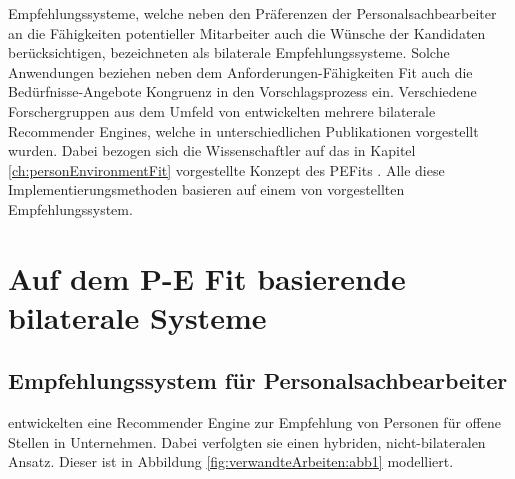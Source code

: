Empfehlungssysteme, welche neben den Präferenzen der Personalsachbearbeiter an die Fähigkeiten potentieller Mitarbeiter auch die Wünsche der Kandidaten berücksichtigen, bezeichneten \textcite[S. 4]{malinowski:2006} als bilaterale Empfehlungssysteme. Solche Anwendungen beziehen neben dem Anforderungen-Fähigkeiten Fit auch die Bedürfnisse-Angebote Kongruenz in den Vorschlagsprozess ein. Verschiedene Forschergruppen aus dem Umfeld von \textcite[S. 1ff.]{malinowski:2006} entwickelten mehrere bilaterale Recommender Engines, welche in unterschiedlichen Publikationen vorgestellt wurden. Dabei bezogen sich die Wissenschaftler auf das in Kapitel \ref{ch:personEnvironmentFit} vorgestellte Konzept des \acp{PEFit} \cite[S. 4f.]{keim:2007}\cite[S. 3f.]{keim:2005}\cite[S. 3f.]{malinowski:2005}\cite[S. 3f.]{malinowski:2006}\cite[S. 3ff.]{malinowski:2008}. Alle diese Implementierungsmethoden basieren auf einem von \textcite[S. 1ff.]{faerber:2003} vorgestellten Empfehlungssystem.

\section{Auf dem P-E Fit basierende bilaterale Systeme}
\label{ch:verwandteArbeiten:aufDemPEFitBasierendeBilateraleSysteme}

\subsection{Empfehlungssystem für Personalsachbearbeiter}
\label{ch:verwandteArbeiten:aufDemPEFitBasierendeBilateraleSysteme:grundlegendesEmpfelungssystem}
\textcite[S. 4ff.]{faerber:2003} entwickelten eine Recommender Engine zur Empfehlung von Personen für offene Stellen in Unternehmen. Dabei verfolgten sie einen hybriden, nicht-bilateralen Ansatz. Dieser ist in Abbildung \ref{fig:verwandteArbeiten:abb1} modelliert.

